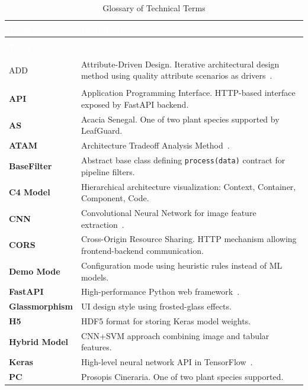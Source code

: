 \documentclass[11pt,a4paper,oneside]{report}
\newcommand{\code}[1]{\texttt{\footnotesize #1}}
\begin{document}
\begin{longtable}{>{\bfseries\footnotesize}p{3.5cm} >{\footnotesize}p{10cm}}
\caption{Glossary of Technical Terms} \label{tab:glossary} \\
\toprule
\rowcolor{tableheader}
\textcolor{white}{Term} & \textcolor{white}{Definition} \\
\midrule
\endfirsthead
\multicolumn{2}{c}{\footnotesize\tablename\ \thetable{} -- continued} \\
\toprule
\rowcolor{tableheader}
\textcolor{white}{Term} & \textcolor{white}{Definition} \\
\midrule
\endhead
\bottomrule
\endlastfoot

ADD & Attribute-Driven Design. Iterative architectural design method using quality attribute scenarios as drivers~\cite{wojcik2006}. \\
\rowcolor{tablerow}
API & Application Programming Interface. HTTP-based interface exposed by FastAPI backend. \\
AS & Acacia Senegal. One of two plant species supported by LeafGuard. \\
\rowcolor{tablerow}
ATAM & Architecture Tradeoff Analysis Method~\cite{kazman2000atam}. \\
BaseFilter & Abstract base class defining \code{process(data)} contract for pipeline filters. \\
\rowcolor{tablerow}
C4 Model & Hierarchical architecture visualization: Context, Container, Component, Code. \\
CNN & Convolutional Neural Network for image feature extraction~\cite{lecun2015deep}. \\
\rowcolor{tablerow}
CORS & Cross-Origin Resource Sharing. HTTP mechanism allowing frontend-backend communication. \\
Demo Mode & Configuration mode using heuristic rules instead of ML models. \\
\rowcolor{tablerow}
FastAPI & High-performance Python web framework~\cite{fastapi2024}. \\
Glassmorphism & UI design style using frosted-glass effects. \\
\rowcolor{tablerow}
H5 & HDF5 format for storing Keras model weights. \\
Hybrid Model & CNN+SVM approach combining image and tabular features. \\
\rowcolor{tablerow}
Keras & High-level neural network API in TensorFlow~\cite{tensorflow2024}. \\
PC & Prosopis Cineraria. One of two plant species supported. \\

\end{longtable}
\end{document}
